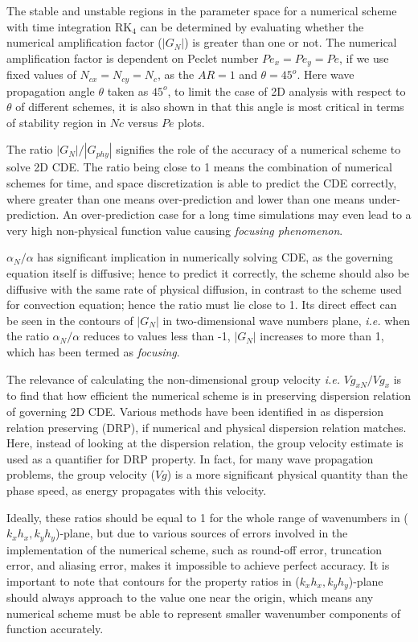 \documentclass[showpacs,preprintnumbers,amsmath,amssymb]{revtex4-1} %
\begin{document}
The stable and unstable regions in the parameter space for a numerical scheme with time integration RK$_4$ can be determined by evaluating whether the numerical amplification factor ($|G_N|$) is greater than one or not. The numerical amplification factor is dependent on Peclet number $Pe_x=Pe_y=Pe$, if we use fixed values of $N_{cx}=N_{cy}=N_{c}$, as the $AR=1$ and $\theta=45^o$. Here wave propagation angle $\theta$ taken as $45^o$, to limit the case of 2D analysis with respect to $\theta$ of different schemes, it is also shown in \cite{pirozzoli2019} that this angle is most critical in terms of stability region in $Nc$ versus $Pe$ plots.

The ratio $|G_N|/|G_{phy}|$ signifies the role of the accuracy of a numerical scheme to solve 2D CDE. The ratio being close to 1 means the combination of numerical schemes for time, and space discretization is able to predict the CDE correctly, where greater than one means over-prediction and lower than one means under-prediction. An over-prediction case for a long time simulations may even lead to a very high non-physical function value causing \textit{focusing phenomenon}.

$\alpha_N/\alpha$ has significant implication in numerically solving CDE, as the governing equation itself is diffusive; hence to predict it correctly, the scheme should also be diffusive with the same rate of physical diffusion, in contrast to the scheme used for convection equation; hence the ratio must lie close to 1. Its direct effect can be seen in the contours of $|G_N|$ in two-dimensional wave numbers plane, \textit{i.e.} when the ratio $\alpha_N/\alpha$ reduces to values less than -1, $|G_N|$ increases to more than 1, which has been termed as \textit{focusing}.

The relevance of calculating the non-dimensional group velocity \textit{i.e.} $Vg_{xN}/Vg_x$ is to find that how efficient the numerical scheme is in preserving dispersion relation of governing 2D CDE. Various methods have been identified in \cite{SENGUPTA_Et_al_4} as dispersion relation preserving (DRP), if numerical and physical dispersion relation matches. Here, instead of looking at the dispersion relation, the group velocity estimate is used as a quantifier for DRP property. In fact, for many wave propagation problems, the group velocity ($Vg$) is a more significant physical quantity than the phase speed, as energy propagates with this velocity.

Ideally, these ratios should be equal to 1 for the whole range of wavenumbers in ($k_xh_x, k_yh_y$)-plane, but due to various sources of errors involved in the implementation of the numerical scheme, such as round-off error, truncation error, and aliasing error, makes it impossible to achieve perfect accuracy. It is important to note that contours for the property ratios in ($k_xh_x, k_yh_y$)-plane should always approach to the value one near the origin, which means any numerical scheme must be able to represent smaller wavenumber components of function accurately.
\end{document}
